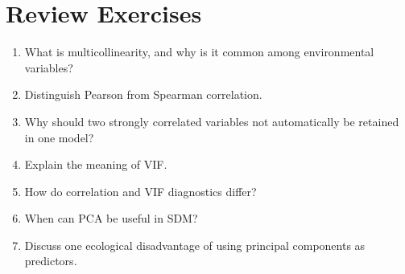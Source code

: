 \section{Review Exercises}

\begin{enumerate}
  \item What is multicollinearity, and why is it common among environmental variables?
  \item Distinguish Pearson from Spearman correlation.
  \item Why should two strongly correlated variables not automatically be retained in one model?
  \item Explain the meaning of VIF.
  \item How do correlation and VIF diagnostics differ?
  \item When can PCA be useful in SDM?
  \item Discuss one ecological disadvantage of using principal components as predictors.
\end{enumerate}
